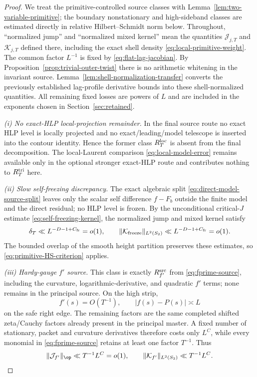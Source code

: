 \begin{proof}
We treat the primitive-controlled source classes with
Lemma~\ref{lem:two-variable-primitive}; the boundary nonstationary and
high-sideband classes are estimated directly in relative Hilbert--Schmidt norm
below. Throughout, ``normalized jump'' and ``normalized mixed kernel'' mean the
quantities $\mathcal J_{j,T}$ and $\mathcal K_{j,T}$ defined there, including
the exact shell density \eqref{eq:local-primitive-weight}. The common factor
$L^{-1}$ is fixed by \eqref{eq:flat-lag-jacobian}. By
Proposition~\ref{prop:trivial-outer-twist} there is no arithmetic whitening in
the invariant source. Lemma~\ref{lem:shell-normalization-transfer} converts the
previously established lag-profile derivative bounds into these shell-normalized
quantities. All remaining fixed losses are powers of $L$ and are included in
the exponents chosen in Section~\ref{sec:retained}.

\emph{(i) No exact-HLP local-projection remainder.}
In the final source route no exact HLP level is locally projected and no
exact/leading/model telescope is inserted into the contour identity.  Hence the
former class $R_T^{\rm loc}$ is absent from the final decomposition.  The
local-Laurent comparison \eqref{eq:local-model-error} remains available only in
the optional stronger exact-HLP route and contributes nothing to
$R_T^{\rm tri}$ here.

\emph{(ii) Slow self-freezing discrepancy.}
The exact algebraic split \eqref{eq:direct-model-source-split} leaves only the
scalar self difference $f-F_b$ outside the finite model and the direct residual;
no HLP level is frozen.  By the unconditional critical-$J$ estimate
\eqref{eq:self-freezing-kernel}, the normalized jump and mixed kernel satisfy
\[
\delta_T\ll L^{-D-1+C_{\rm fr}}=o(1),
\qquad
\|\mathcal K_{\rm freeze}\|_{L^2(S_2)}
\ll L^{-D-1+C_{\rm fr}}=o(1).
\]
The bounded overlap of the smooth height partition preserves these estimates,
so \eqref{eq:primitive-HS-criterion} applies.

\emph{(iii) Hardy-gauge $f'$ source.}
This class is exactly $R_{f'}^{\rm src}$ from \eqref{eq:fprime-source}, including
the curvature, logarithmic-derivative, and quadratic $f'$ terms; none remains in
the principal source. On the high strip,
\[
f'(s)=O(T^{-1}),
\qquad |f(s)-P(s)|\asymp L
\]
on the safe right edge. The remaining factors are the same completed shifted
zeta/Cauchy factors already present in the principal master. A fixed number of
stationary, packet and curvature derivatives therefore costs only $L^C$, while
every monomial in \eqref{eq:fprime-source} retains at least one factor $T^{-1}$.
Thus
\[
\|\mathcal J_{f'}\|_{\op}\ll T^{-1}L^C=o(1),
\qquad
\|\mathcal K_{f'}\|_{L^2(S_2)}\ll T^{-1}L^C.
\]


\end{proof}
